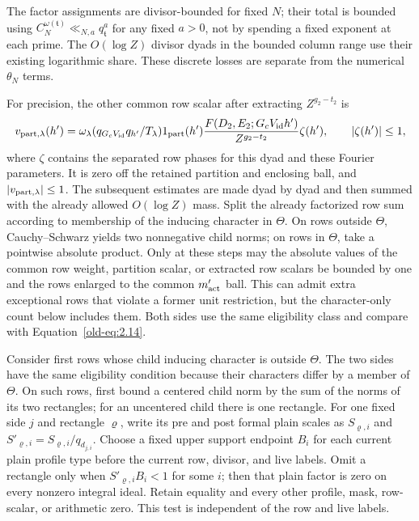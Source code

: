 \documentclass[11pt,a4paper]{article}
\numberwithin{equation}{section}
\numberwithin{figure}{section}
\theoremstyle{definition}
\theoremstyle{remark}
\begin{document}
The factor assignments are divisor-bounded for fixed \(N\); their
total is bounded using \(C_N^{\omega(\mathfrak t)}
\ll_{N,a}q_{\mathfrak t}^a\) for any fixed \(a>0\), not by
spending a fixed exponent at each prime.  The \(O(\log Z)\) divisor
dyads in the bounded column range use their existing logarithmic share.
These discrete losses are separate from the numerical \(\theta_N\) terms.

For precision, the other common row scalar after extracting
\(Z^{g_2-t_2}\) is
\[
 v_{{\rm part},\lambda}(h')=
 \omega_\lambda(q_{G_cV_{\rm id}}q_{h'}/T_\lambda)
 1_{\rm part}(h')
 \frac{F(D_2,E_2;G_cV_{\rm id}h')}{Z^{g_2-t_2}}\zeta(h'),
 \qquad |\zeta(h')|\le1,
\]
where \(\zeta\) contains the separated row phases for this dyad and
these Fourier parameters.  It is zero off the retained partition and
enclosing ball, and \(|v_{{\rm part},\lambda}|\le1\).
The subsequent estimates are made dyad by dyad and then summed with
the already allowed \(O(\log Z)\) mass.  Split the already factorized row sum according to membership of the
inducing character in \(\Theta\).  On rows outside \(\Theta\),
Cauchy--Schwarz yields two nonnegative child norms; on rows in
\(\Theta\), take a pointwise absolute product.  Only at these steps
may the absolute values of the common row weight, partition scalar,
or extracted row scalars be bounded by one and the rows enlarged to
the common \(m'_{\rm act}\) ball.  This can admit extra exceptional
rows that violate a former unit restriction, but the character-only
count below includes them.  Both sides use the same eligibility class
and compare with Equation~\eqref{old-eq:2.14}.

Consider first rows whose child inducing character is outside
\(\Theta\).  The two sides have the same eligibility condition
because their characters differ by a member of \(\Theta\).
On such rows, first bound a centered child norm by the sum of the norms
of its two rectangles; for an uncentered child there is one rectangle.
For one fixed side \(j\) and rectangle \(\varrho\), write its pre and
post formal plain scales as \(S_{\varrho,i}\) and
\(S'_{\varrho,i}=S_{\varrho,i}/q_{d_{j,i}}\).  Choose a fixed upper
support endpoint \(B_i\) for each current plain profile type before
the current row, divisor, and live labels.  Omit a rectangle only when
\(S'_{\varrho,i}B_i<1\) for some \(i\); then that plain factor is zero
on every nonzero integral ideal.  Retain equality and every other profile,
mask, row-scalar, or arithmetic zero.  This test is independent of the
row and live labels.
\end{document}
